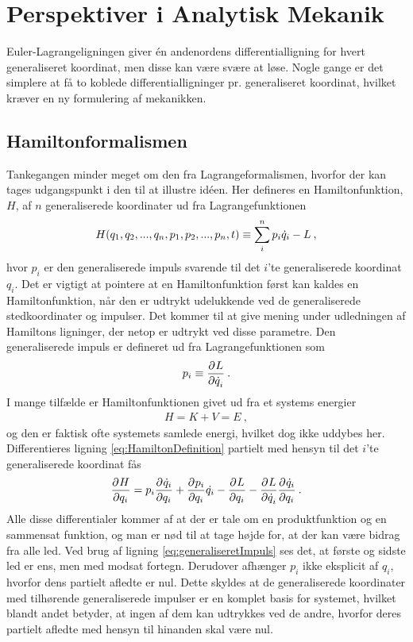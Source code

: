 \section{Perspektiver i Analytisk Mekanik}
Euler-Lagrangeligningen giver én andenordens differentialligning for hvert generaliseret koordinat, men disse kan være svære at løse. Nogle gange er det simplere at få to koblede differentialligninger pr. generaliseret koordinat, hvilket kræver en ny formulering af mekanikken.

\subsection{Hamiltonformalismen}
Tankegangen minder meget om den fra Lagrangeformalismen, hvorfor der kan tages udgangspunkt i den til at illustre idéen. Her defineres en Hamiltonfunktion, $H$, af $n$ generaliserede koordinater ud fra Lagrangefunktionen
%
\begin{align} \label{eq:HamiltonDefinition}
	H(q_1,q_2,...,q_n,p_1,p_2,...,p_n,t) \equiv \sum_i^np_i\dt{q}_i - L \: ,
\end{align}
%
hvor $p_i$ er den generaliserede impuls svarende til det $i$'te generaliserede koordinat $q_i$. Det er vigtigt at pointere at en Hamiltonfunktion først kan kaldes en Hamiltonfunktion, når den er udtrykt udelukkende ved de generaliserede stedkoordinater og impulser. Det kommer til at give mening under udledningen af Hamiltons ligninger, der netop er udtrykt ved disse parametre. Den generaliserede impuls er defineret ud fra Lagrangefunktionen som
\begin{align} \label{eq:generaliseretImpuls}
	p_i \equiv \pdif{\dt{q}_i}{L} \: .
\end{align}
I mange tilfælde er Hamiltonfunktionen givet ud fra et systems energier
\begin{align} \label{eq:H=E}
	H = K + V = E \: ,
\end{align}
og den er faktisk ofte systemets samlede energi, hvilket dog ikke uddybes her. \\%
Differentieres ligning \eqref{eq:HamiltonDefinition} partielt med hensyn til det $i$'te generaliserede koordinat fås
%
\begin{align}
	\pdif{q_i}{H} = p_i\pdif{q_i}{\dt{q}_i} + \pdif{q_i}{p_i}\dt{q_i} - \pdif{q_i}{L} - \pdif{\dt{q}_i}{L}\pdif{q_i}{\dt{q}_i} \: .
\end{align}
%
Alle disse differentialer kommer af at der er tale om en produktfunktion og en sammensat funktion, og man er nød til at tage højde for, at der kan være bidrag fra alle led. Ved brug af ligning \eqref{eq:generaliseretImpuls} ses det, at første og sidste led er ens, men med modsat fortegn. Derudover afhænger $p_i$ ikke eksplicit af $q_i$, hvorfor dens partielt afledte er nul. Dette skyldes at de generaliserede koordinater med tilhørende generaliserede impulser er en komplet basis for systemet, hvilket blandt andet betyder, at ingen af dem kan udtrykkes ved de andre, hvorfor deres partielt afledte med hensyn til hinanden skal være nul. \\
